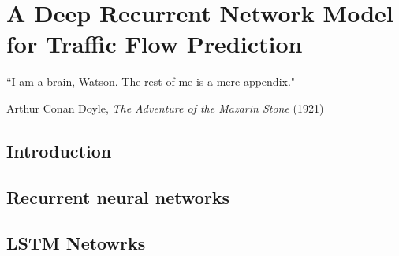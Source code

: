 
\chapter{A Deep Recurrent Network Model for Traffic Flow Prediction} %

\label{Chapter4} %


{``I am a brain, Watson. The rest of me is a mere appendix."}
\begin{flushright}
Arthur Conan Doyle, \textit{The Adventure of the Mazarin Stone} (1921)
\end{flushright}

\section{Introduction}

\section{Recurrent neural networks}

\section{LSTM Netowrks}
